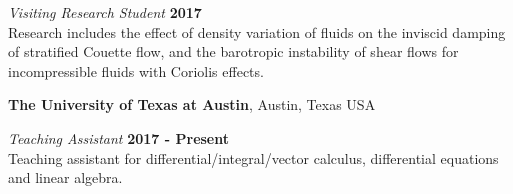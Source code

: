 \documentclass[margin,line]{res}
\newenvironment{list2}{
  \begin{list}{$\bullet$}{%
      \setlength{\itemsep}{0in}
      \setlength{\parsep}{0in} \setlength{\parskip}{0in}
      \setlength{\topsep}{0in} \setlength{\partopsep}{0in} 
      \setlength{\leftmargin}{0.2in}}}{\end{list}}
\begin{document}
\begin{resume}


{\em Visiting Research Student} \hfill {\bf 2017}\\
Research includes the effect of density variation of fluids on the inviscid damping of stratified Couette flow, and the barotropic instability of shear flows for incompressible fluids with Coriolis effects.

{\bf The University of Texas at Austin}, Austin, Texas USA

{\em Teaching Assistant} \hfill {\bf 2017 - Present}\\
Teaching assistant for differential/integral/vector calculus, differential equations and linear algebra.


\fi

\end{resume}
\end{document}
